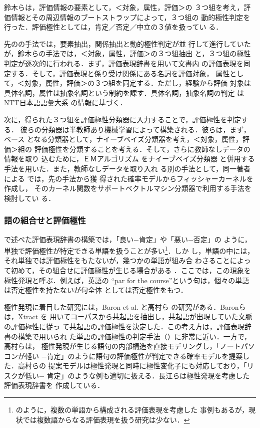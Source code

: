 \vspace{1em}
\underline{\textbf{\cite{suzuki2004a}}}
\vspace{1em}

鈴木ら\cite{suzuki2004a}は，評価情報の要素として，＜対象，属性，評価＞の
３つ組を考え，評価情報とその周辺情報のブートストラップによって，３つ組の
動的極性判定を行った．評価極性としては，肯定／否定／中立の３値を扱ってい
る．

先の\cite{nasukawa2003a}の手法では，要素抽出，関係抽出と動的極性判定が並
行して進行していたが，鈴木らの手法では，＜対象，属性，評価＞の３つ組抽出
と，３つ組の極性判定が逐次的に行われる．まず，評価表現辞書を用いて文書内
の評価表現を同定する．そして，評価表現と係り受け関係にある名詞を評価対象，
属性として，＜対象，属性，評価＞の３つ組を同定する．ただし，経験から評価
対象は具体名詞，属性は抽象名詞という制約を課す．具体名詞，抽象名詞の判定
はNTT日本語語彙大系\cite{goitaikei-e} の情報に基づく．

次に，得られた３つ組を評価極性分類器に入力することで，評価極性を判定する．
彼らの分類器は半教師あり機械学習によって構築される．彼らは，まず，ベース
となる分類器として，ナイーブベイズ分類器を考え，＜対象，属性，評価＞組の
評価極性を分類することを考える．そして，さらに教師なしデータの情報を取り
込むために，ＥＭアルゴリズム\cite{dempster1977a} をナイーブベイズ分類器
と併用する手法\cite{nigam2000a}を用いた．また，教師なしデータを取り入れ
る別の手法として，同一著者による \cite{suzuki2005a}では，先の手法から獲
得された確率モデルからフィッシャーカーネル\cite{jaakkola1998}を作成し，
そのカーネル関数をサポートベクトルマシン分類器で利用する手法を検討してい
る．

\subsubsection{語の組合せと評価極性}
\label{sec:comb}

で述べた評価表現辞書の構築では，「良い−肯定」や「悪い−否定」の
ように，単独で評価極性が特定できる単語を扱うことが多い\footnote{
\cite{nasukawa2004a}のように，複数の単語から構成される評価表現を考慮した
事例もあるが，現状では複数語からなる評価表現を扱う研究は少ない．}．しか
し，単語の中には，それ単独では評価極性をもたないが，幾つかの単語が組み合
わさることによって初めて，その組合せに評価極性が生じる場合がある
\cite{baron2004a}．ここでは，この現象を極性発現と呼ぶ．例えば，英語の
``par for the course''という句は，個々の単語は否定極性を持たないが句全体
としては否定極性をもつ\cite{channell2000a}．

極性発現に着目した研究には，Baron et al. \cite{baron2004a}と高村ら
\cite{takamura2005b}の研究がある．Baronらは，Xtract \cite{smadja1994a}を
用いてコーパスから共起語を抽出し，共起語が出現していた文脈の評価極性に従っ
て共起語の評価極性を決定した．この考え方は，評価表現辞書の構築で用いられ
た単語の評価極性の判定手法（）に非常に近い．一方で，高村らは，
極性発現が生じる語句の内部構造を直接モデリングし，「ノートパソコンが軽い
−肯定」のように語句の評価極性が判定できる確率モデルを提案した．高村らの
提案モデルは極性発現と同時に極性変化子にも対応しており，「リスクが低い−
肯定」のような例も適切に扱える．長江らは極性発現を考慮した評価表現辞書を
作成している\cite{nagae2002a}．

